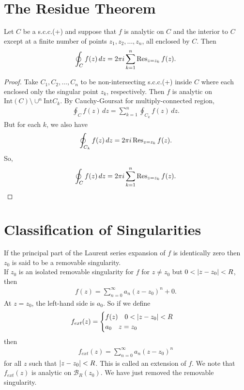 \documentclass{article}
\theoremstyle{definition}
\begin{document}
\section{The Residue Theorem}

Let $C$ be a s.c.c.(+) and suppose that $f$ is analytic on $C$ and the interior to $C$ except at a finite number of points $z_1, z_2, \dots, z_n$, all enclosed by $C$. Then
\begin{align}
\oint_C f(z)\,dz = 2\pi i\sum^n_{k=1}\Res_{z = z_k} f(z).
\end{align}

\begin{proof}
	Take $C_1, C_2, \dots, C_n$ to be non-intersecting s.c.c.(+) inside $C$ where each enclosed only the singular point $z_k$, respectively. Then $f$ is analytic on $\text{Int}(C)\setminus \cup^n \text{Int}C_k$. By Cauchy-Goursat for multiply-connected region, 
	\begin{align}
	\oint_C f(z)\,dz = \sum^n_{k=1}\oint_{C_k} f(z)\,dz.
	\end{align}
	But for each $k$, we also have
	\begin{align}
	\oint_{C_k} f(z)\,dz = 2\pi i \Res_{z = z_k} f(z).
	\end{align}
	So,
	\begin{align}
	\oint_C f(z)\,dz = 2\pi i\sum^n_{k=1}\Res_{z = z_k} f(z).
	\end{align}\qedhere
\end{proof}



\section{Classification of Singularities}

If the principal part of the Laurent series expansion of $f$ is identically zero then $z_0$ is said to be a removable singularity. \\

If $z_0$ is an isolated removable singularity for $f$ for $z \neq z_0$ but $0 < \abs{z - z_0} < R$, then 
\begin{align}
f(z) = \sum^\infty_{n=0}a_n (z - z_0)^n+ 0 .
\end{align}
At $z = z_0$, the left-hand side is $a_0$. So if we define
\begin{align}
f_{ext}(z) = \begin{cases}
f(z) \quad 0 < \abs{z - z_0} < R\\
a_0 \quad z = z_0
\end{cases}
\end{align}
then 
\begin{align}
f_{ext}(z) = \sum^\infty_{n=0}a_n (z - z_0)^n 
\end{align}
for all $z$ such that $\abs{z - z_0} < R$. This is called an extension of $f$. We note that $f_{ext}(z)$ is analytic on $\mathcal{B}_R(z_0)$. We have just removed the removable singularity. \\
\end{document}
